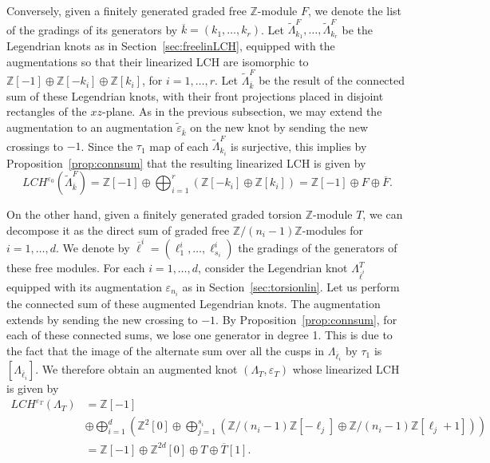 \documentclass[11pt]{amsart}
\theoremstyle{plain}
\theoremstyle{remark}
\numberwithin{equation}{section}
\newcommand{\Z}{\ensuremath{\mathbb{Z}}}
\begin{document}
Conversely, given a finitely generated graded free $\Z$-module $F$, we denote the list of the gradings of its generators by 
$\overline{k} = (k_1, \ldots, k_r)$. Let $\widetilde{\Lambda}^F_{k_1}, \ldots, \widetilde{\Lambda}^F_{k_r}$ be the Legendrian knots
as in Section~\ref{sec:freelinLCH}, equipped with the augmentations so that their linearized LCH are isomorphic to $\Z[-1] \oplus \Z[-k_i] \oplus \Z[k_i]$,
for $i = 1, \ldots, r$. Let $\widetilde{\Lambda}^F_{\overline{k}}$ be the result of the connected sum of these Legendrian knots, with their front projections placed in disjoint rectangles of the $xz$-plane. As in the previous subsection, we may extend the augmentation to an augmentation $\widetilde{\varepsilon}_{\overline{k}}$ on the new knot by sending the new crossings to $-1$. Since
the $\tau_1$ map of each $\widetilde{\Lambda}^F_{k_i}$ is surjective, this implies by Proposition~\ref{prop:connsum} that the resulting linearized LCH is
given by
$$
LCH^{\varepsilon_0}(\widetilde{\Lambda}^F_{\overline{k}}) = \Z[-1] \oplus \bigoplus_{i=1}^r ( \Z[-k_i] \oplus \Z[k_i]) = \Z[-1] \oplus F \oplus \overline{F}.
$$

On the other hand, given a finitely generated graded torsion $\Z$-module $T$, we can decompose it as the direct sum of graded free 
$\Z/(n_i-1)\Z$-modules for $i = 1, \ldots, d$. We denote by $\overline{\ell}^i = (\ell^i_1, \ldots, \ell^i_{s_i})$ the gradings of the generators of these
free modules. For each $i=1, \ldots, d$, consider the Legendrian knot $\Lambda^T_{\overline{\ell}^i}$ equipped with its augmentation $\varepsilon_{n_i}$
as in Section~\ref{sec:torsionlin}. Let us perform the connected sum of these augmented Legendrian knots. The augmentation extends by sending the new crossing to $-1$. By Proposition~\ref{prop:connsum},  for each of these connected sums, we lose one generator in degree 1. This is due to the fact that the image of the alternate sum over all the cusps in $\Lambda_{\overline{\ell}_i}$ by $\tau_1$ is $[\Lambda_{\overline{\ell}_i}]$. We therefore obtain an augmented knot $(\Lambda_T, \varepsilon_T)$ whose 
linearized LCH is given by
\begin{align*}
LCH^{\varepsilon_T}(\Lambda_T) &= \Z[-1] \\
& \oplus \bigoplus_{i=1}^d \left(\Z^{2}[0] \oplus \bigoplus_{j=1}^{s_i} ( \Z/(n_i-1)\Z[-\ell_j] \oplus \Z/(n_i-1)\Z[\ell_j+1]) \right) \\
&= \Z[-1] \oplus \Z^{2d}[0] \oplus T \oplus \overline{T}[1].
\end{align*}
\end{document}
